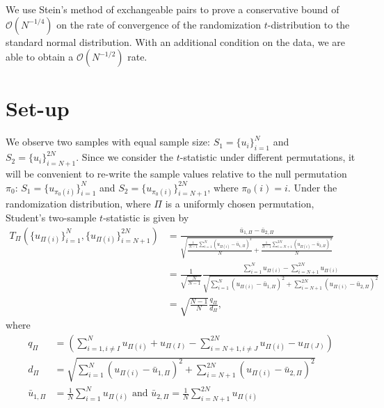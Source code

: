 We use Stein's method of exchangeable pairs to prove a conservative
bound of $\mathcal{O}(N^{-1/4})$ on the rate of convergence of the randomization
$t$-distribution to the standard normal distribution.  With an
additional condition on the data, we are able to obtain a
$\mathcal{O}(N^{-1/2})$ rate.

\section{Set-up}
We observe two samples with equal sample size: $S_1 = \{u_i\}_{i=1}^N$
and $S_2 = \{u_i\}_{i=N+1}^{2N}$.  Since we consider the $t$-statistic
under different permutations, it will be convenient to re-write the
sample values relative to the null permutation $\pi_0$: $S_1 =
\{u_{\pi_0(i)}\}_{i=1}^N$ and $S_2 = \{u_{\pi_0(i)}\}_{i=N+1}^{2N}$,
where $\pi_0(i) = i$.  Under the randomization distribution, where
$\Pi$ is a uniformly chosen permutation, Student's two-sample
$t$-statistic is given by
\begin{align*}
T_{\Pi}(\{u_{\Pi(i)}\}_{i=1}^N, \{u_{\Pi(i)}\}_{i=N+1}^{2N})
&= \frac{\bar{u}_{1,\Pi} - \bar{u}_{2,\Pi}}{\sqrt{\frac{\frac{1}{N-1}
      \sum_{i=1}^N(u_{\Pi(i)} - \bar{u}_{1,\Pi})^2}{N} + \frac{\frac{1}{N-1}
      \sum_{i=N+1}^{2N}(u_{\Pi(i)} - \bar{u}_{2,\Pi})^2}{N}}} \\
&= \frac{1}{\sqrt{\frac{N}{N-1}}} \frac{\sum_{i=1}^N u_{\Pi(i)} -
  \sum_{i=N+1}^{2N}u_{\Pi(i)}}{\sqrt{\sum_{i=1}^N(u_{\Pi(i)} -
    \bar{u}_{1,\Pi})^2 + \sum_{i=N+1}^{2N}(u_{\Pi(i)} - \bar{u}_{2,\Pi})^2}} \\
&= \sqrt{\frac{N-1}{N}}\frac{q_\Pi}{d_\Pi},
\end{align*}
where
\begin{align*}
  q_\Pi &= \left (\sum_{i=1, i\neq I}^N u_{\Pi(i)} + u_{\Pi(I)} -
    \sum_{i=N+1, i\neq J}^{2N}u_{\Pi(i)} - u_{\Pi(J)}\right ) \\
  d_\Pi &= \sqrt{\sum_{i=1}^N(u_{\Pi(i)} - \bar{u}_{1,\Pi})^2 +
    \sum_{i=N+1}^{2N}(u_{\Pi(i)} - \bar{u}_{2,\Pi})^2} \\
  \bar{u}_{1,\Pi} &= \frac{1}{N} \sum_{i=1}^N u_{\Pi(i)} \text{ and }
  \bar{u}_{2,\Pi} = \frac{1}{N} \sum_{i=N+1}^{2N} u_{\Pi(i)}
\end{align*}

